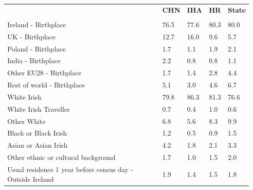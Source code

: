 \documentclass{article}
\begin{document}
\pagebreak
\begin{table}[h]	
\centering
		\begin{tabular}{KTTTT}
  \hline
& \textbf{CHN} & \textbf{IHA} & \textbf{HR}& \textbf{State}\\ 
  \hline
    \\ 
    \hline
Ireland - Birthplace & 76.5& 77.6& 80.3& 80.0\\
UK - Birthplace & 12.7& 16.0&  9.6&  5.7\\
Poland - Birthplace & 1.7& 1.1& 1.9& 2.1\\
India - Birthplace & 2.2& 0.8& 0.8& 1.1\\
Other EU28 - Birthplace & 1.7& 1.4& 2.8& 4.4\\
Rest of world - Birthplace & 5.1& 3.0& 4.6& 6.7\\
    \hline
White Irish & 79.8& 86.3& 81.3& 76.6\\
White Irish Traveller & 0.7& 0.4& 1.0& 0.6\\
Other White & 6.8& 5.6& 8.3& 9.9\\
Black or Black Irish & 1.2& 0.5& 0.9& 1.5\\
Asian or Asian Irish & 4.2& 1.8& 2.1& 3.3\\
Other ethnic or cultural background & 1.7& 1.0& 1.5& 2.0\\
    \hline
Usual residence 1 year before census day - Outside Ireland & 1.9& 1.4& 1.5& 1.8\\


\end{tabular}
\end{table}
\end{document}
